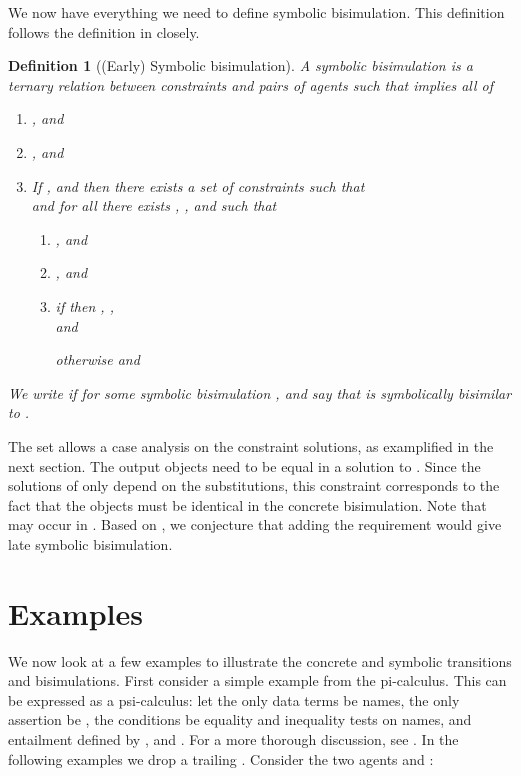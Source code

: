 \documentclass{eptcs}
\newtheorem{definition}{Definition}
\theoremstyle{definition}
\begin{document}
\begin{comment}
\begin{definition}[Equal actions]
 Two actions  and  are equal for , written
, is defined as

\end{definition}
\end{comment}

We now have everything we need to define symbolic bisimulation. This definition
follows the definition in \cite{hennessy.lin:symbolic-bisimulations} closely.

\begin{definition}[(Early) Symbolic bisimulation]\label{def:symbisim}
A {\em symbolic bisimulation}
  is a ternary relation between constraints and pairs of agents such
that  implies all of

\begin{enumerate}
\item , and
\item , and
\item If ,
 and  then there exists a set of constraints
 such that 
 \\
and for all
 there exists , , and  such that

\begin{enumerate}
\item , and
\item , and
\item if  then , , \\
 and 

otherwise  and 
\end{enumerate}
\end{enumerate}
We write  if  for some symbolic
bisimulation , and say that  is \emph{symbolically
bisimilar} to .
\end{definition}


The set  allows a case analysis on the constraint solutions, as examplified in the next section. 
The output objects need to be equal in a solution to . Since
the solutions of   only depend on the substitutions, this constraint corresponds to the fact that the objects must be identical in the concrete bisimulation.
Note that  may occur in . Based on
\cite{boreale.de-nicola:symbolic-semantics,lin:symbolic-transition}, we
conjecture that adding the requirement
 would give late symbolic bisimulation.

\section{Examples}
\label{sec:examples}
We now look at a few examples to illustrate the concrete and
symbolic transitions and bisimulations. First consider a simple example from the pi-calculus.
This can be expressed as a psi-calculus: let the only data terms be
names,  the only
assertion be , the conditions be equality and inequality tests on
names, and entailment defined by ,  and . For a more thorough discussion,
see \cite{bengtson.johansson.ea:psi-calculi}. In the following examples we drop a trailing .
Consider the two agents  and :
\end{document}
